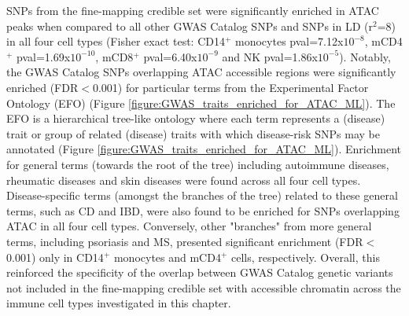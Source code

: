 SNPs from the fine-mapping credible set were significantly enriched in ATAC peaks when compared to all other GWAS Catalog SNPs and SNPs in LD (r$^2$=8) in all four cell types (Fisher exact test: CD14$^+$ monocytes pval=7.12x$10^{-8}$, mCD4$^+$ pval=1.69x$10^{-10}$, mCD8$^+$ pval=6.40x$10^{-9}$ and NK pval=1.86x$10^{-5}$). Notably, the GWAS Catalog SNPs overlapping ATAC accessible regions were significantly enriched (FDR$<$0.001) for particular terms from the Experimental Factor Ontology (EFO) (Figure \ref{figure:GWAS_traits_enriched_for_ATAC_ML}). The EFO is a hierarchical tree-like ontology where each term represents a (disease) trait or group of related (disease) traits with which disease-risk SNPs may be annotated (Figure \ref{figure:GWAS_traits_enriched_for_ATAC_ML}). Enrichment for general terms (towards the root of the tree) including autoimmune diseases, rheumatic diseases and skin diseases were found across all four cell types. Disease-specific terms (amongst the branches of the tree) related to these general terms, such as CD and IBD, were also found to be enriched for SNPs overlapping ATAC in all four cell types. Conversely, other "branches" from more general terms, including psoriasis and MS, presented significant enrichment (FDR$<$0.001) only in CD14$^+$ monocytes and mCD4$^+$ cells, respectively. Overall, this reinforced the specificity of the overlap between GWAS Catalog genetic variants not included in the fine-mapping credible set with accessible chromatin across the immune cell types investigated in this chapter.







